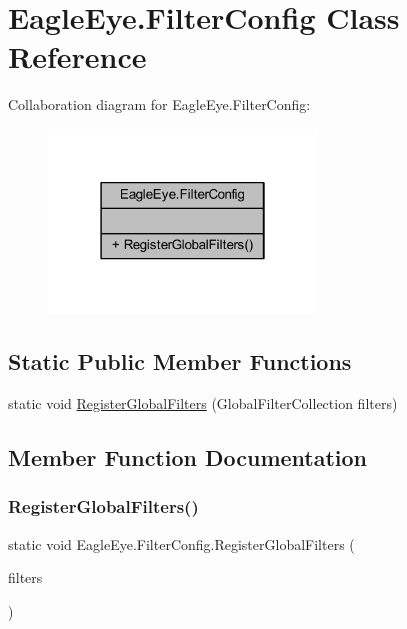 \hypertarget{class_eagle_eye_1_1_filter_config}{}\section{Eagle\+Eye.\+Filter\+Config Class Reference}
\label{class_eagle_eye_1_1_filter_config}


Collaboration diagram for Eagle\+Eye.\+Filter\+Config\+:\nopagebreak
\begin{figure}[H]
\begin{center}
\leavevmode
\includegraphics[width=202pt]{class_eagle_eye_1_1_filter_config__coll__graph}
\end{center}
\end{figure}
\subsection*{Static Public Member Functions}
\begin{DoxyCompactItemize}
\item 
static void \mbox{\hyperlink{class_eagle_eye_1_1_filter_config_a95dcc0b5bd9bab3b88294d176c4db95f}{Register\+Global\+Filters}} (Global\+Filter\+Collection filters)
\end{DoxyCompactItemize}


\subsection{Member Function Documentation}
\mbox{\label{class_eagle_eye_1_1_filter_config_a95dcc0b5bd9bab3b88294d176c4db95f}} 
\subsubsection{\texorpdfstring{RegisterGlobalFilters()}{RegisterGlobalFilters()}}
{\footnotesize\ttfamily static void Eagle\+Eye.\+Filter\+Config.\+Register\+Global\+Filters (\begin{DoxyParamCaption}\item[{Global\+Filter\+Collection}]{filters }\end{DoxyParamCaption})\hspace{0.3cm}{\ttfamily [static]}}

